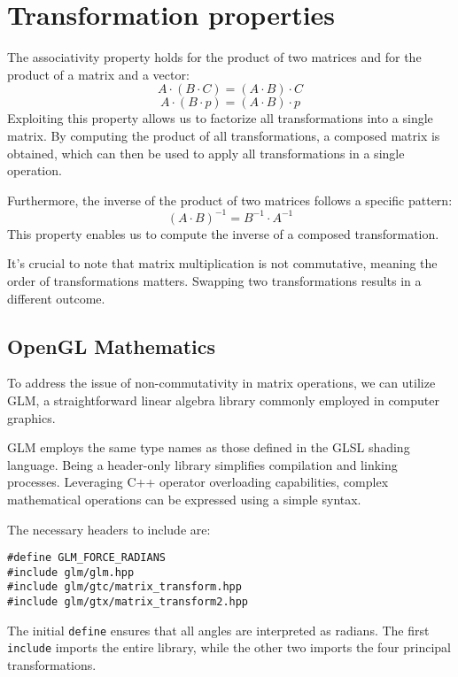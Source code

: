 \section{Transformation properties}

The associativity property holds for the product of two matrices and for the product of a matrix and a vector:
\[A \cdot \left(B \cdot C\right)=\left(A \cdot B\right) \cdot C\]
\[A \cdot \left(B \cdot p\right)=\left(A \cdot B\right) \cdot p\]
Exploiting this property allows us to factorize all transformations into a single matrix. 
By computing the product of all transformations, a composed matrix is obtained, which can then be used to apply all transformations in a single operation.

Furthermore, the inverse of the product of two matrices follows a specific pattern:
\[\left( A \cdot B \right)^{-1}=B^{-1}\cdot A^{-1}\]
This property enables us to compute the inverse of a composed transformation. 

It's crucial to note that matrix multiplication is not commutative, meaning the order of transformations matters. 
Swapping two transformations results in a different outcome.

\subsection{OpenGL Mathematics}
To address the issue of non-commutativity in matrix operations, we can utilize GLM, a straightforward linear algebra library commonly employed in computer graphics.

GLM employs the same type names as those defined in the GLSL shading language. 
Being a header-only library simplifies compilation and linking processes. 
Leveraging C++ operator overloading capabilities, complex mathematical operations can be expressed using a simple syntax.

The necessary headers to include are:
\begin{verbatim}
#define GLM_FORCE_RADIANS    
#include glm/glm.hpp
#include glm/gtc/matrix_transform.hpp
#include glm/gtx/matrix_transform2.hpp
\end{verbatim}
The initial \texttt{define} ensures that all angles are interpreted as radians. 
The first \texttt{include} imports the entire library, while the other two imports the four principal transformations.

